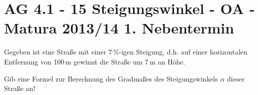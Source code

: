 \section{AG 4.1 - 15 Steigungswinkel - OA - Matura 2013/14 1. Nebentermin}

\begin{beispiel}[AG 4.1]{1} %
				Gegeben ist eine Straße mit einer $7\,\%$-igen Steigung, d.h. auf einer horizontalen Entfernung von 100\,m gewinnt die Straße um 7\,m an Höhe.
				
				Gib eine Formel zur Berechnung des Gradmaßes des Steigungswinkels $\alpha$ dieser Straße an!
				
\end{beispiel}
